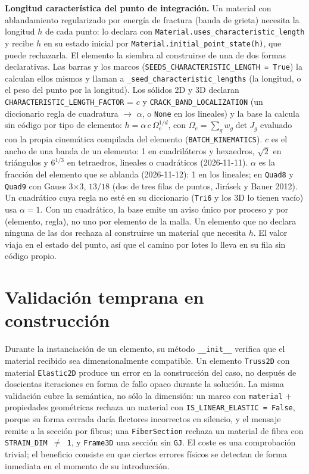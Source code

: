 \documentclass[11pt,oneside]{report}
\begin{document}
\textbf{Longitud característica del punto de integración.} Un material con ablandamiento regularizado por energía de fractura (banda de grieta) necesita la longitud $h$ de cada punto: lo declara con \texttt{Material.\allowbreak{}uses\_\allowbreak{}characteristic\_\allowbreak{}length} y recibe $h$ en su estado inicial por \texttt{Material.\allowbreak{}initial\_\allowbreak{}point\_\allowbreak{}state(h)}, que puede rechazarla. El elemento la siembra al construirse de una de dos formas declarativas. Las barras y los marcos (\texttt{SEEDS\_\allowbreak{}CHARACTERISTIC\_\allowbreak{}LENGTH = True}) la calculan ellos mismos y llaman a \texttt{\_\allowbreak{}seed\_\allowbreak{}characteristic\_\allowbreak{}lengths} (la longitud, o el peso del punto por la longitud). Los sólidos 2D y 3D declaran \texttt{CHARACTERISTIC\_\allowbreak{}LENGTH\_\allowbreak{}FACTOR} = $c$ y \texttt{CRACK\_\allowbreak{}BAND\_\allowbreak{}LOCALIZATION} (un diccionario regla de cuadratura \ensuremath{\to} $\alpha$, o \texttt{None} en los lineales) y la base la calcula sin código por tipo de elemento: $h = \alpha\,c\,\Omega_e^{1/d}$, con $\Omega_e = \sum_g w_g \det J_g$ evaluado con la propia cinemática compilada del elemento (\texttt{BATCH\_KINEMATICS}). $c$ es el ancho de una banda de un elemento: 1 en cuadriláteros y hexaedros, $\sqrt2$ en triángulos y $6^{1/3}$ en tetraedros, lineales o cuadráticos (2026-11-11). $\alpha$ es la fracción del elemento que se ablanda (2026-11-12): 1 en los lineales; en \texttt{Quad8} y \texttt{Quad9} con Gauss 3\ensuremath{\times}3, $13/18$ (dos de tres filas de puntos, Jirásek y Bauer 2012). Un cuadrático cuya regla no esté en su diccionario (\texttt{Tri6} y los 3D lo tienen vacío) usa $\alpha = 1$. Con un cuadrático, la base emite un aviso único por proceso y por (elemento, regla), no uno por elemento de la malla. Un elemento que no declara ninguna de las dos rechaza al construirse un material que necesita $h$. El valor viaja en el estado del punto, así que el camino por lotes lo lleva en su fila sin código propio.

\section{Validación temprana en construcción}

Durante la instanciación de un elemento, su método \texttt{\_\_init\_\_} verifica que el material recibido sea dimensionalmente compatible. Un elemento \texttt{Truss2D} con material \texttt{Elastic2D} produce un error en la construcción del caso, no después de doscientas iteraciones en forma de fallo opaco durante la solución. La misma validación cubre la semántica, no sólo la dimensión: un marco con \texttt{material} + propiedades geométricas rechaza un material con \texttt{IS\_\allowbreak{}LINEAR\_\allowbreak{}ELASTIC = False}, porque su forma cerrada daría flectores incorrectos en silencio, y el mensaje remite a la sección por fibras; una \texttt{FiberSection} rechaza un material de fibra con \texttt{STRAIN\_DIM \ensuremath{\neq} 1}, y \texttt{Frame3D} una sección sin \texttt{GJ}. El coste es una comprobación trivial; el beneficio consiste en que ciertos errores físicos se detectan de forma inmediata en el momento de su introducción.
\end{document}
